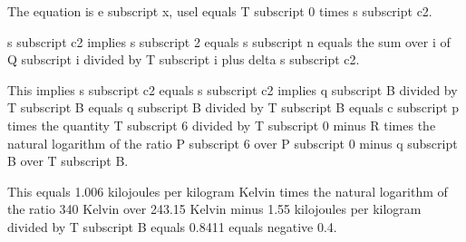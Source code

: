 The equation is e subscript x, usel equals T subscript 0 times s subscript c2.

s subscript c2 implies s subscript 2 equals s subscript n equals the sum over i of Q subscript i divided by T subscript i plus delta s subscript c2.

This implies s subscript c2 equals s subscript c2 implies q subscript B divided by T subscript B equals q subscript B divided by T subscript B equals c subscript p times the quantity T subscript 6 divided by T subscript 0 minus R times the natural logarithm of the ratio P subscript 6 over P subscript 0 minus q subscript B over T subscript B.

This equals 1.006 kilojoules per kilogram Kelvin times the natural logarithm of the ratio 340 Kelvin over 243.15 Kelvin minus 1.55 kilojoules per kilogram divided by T subscript B equals 0.8411 equals negative 0.4.